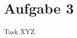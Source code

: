 
\section{Aufgabe 3}

\setcounter{exercise}{1}

\begin{frame}[allowframebreaks]{Task \thesection}{XYZ}
\end{frame}
